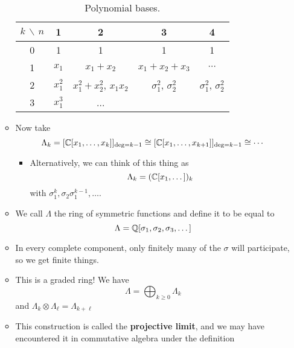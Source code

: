 \documentclass[../notes.tex]{subfiles}
\begin{document}
\begin{itemize}
\begin{itemize}
        \begin{table}[h!]
            \centering
            \small
            \renewcommand{\arraystretch}{1.2}
            \begin{tabular}{c|cccc}
                $k\,\backslash\,n$ & 1 & 2 & 3 & 4\\
                \hline
                0 & 1 & 1 & 1 & 1\\
                1 & $x_1$ & $x_1+x_2$ & $x_1+x_2+x_3$ & $\cdots$\\
                2 & $x_1^2$ & $x_1^2+x_2^2$, $x_1x_2$ & $\sigma_1^2$, $\sigma_2^2$ & $\sigma_1^2$, $\sigma_2^2$\\
                3 & $x_1^3$ & ...
            \end{tabular}
            \caption{Polynomial bases.}
            \label{tab:polynomialBases}
        \end{table}
        \item Now take
        \begin{equation*}
            \Lambda_k = [\mathbb{C}[x_1,\dots,x_k]]_{\deg=k-1}
            \cong [\mathbb{C}[x_1,\dots,x_{k+1}]]_{\deg=k-1}
            \cong \cdots
        \end{equation*}
        \begin{itemize}
            \item Alternatively, we can think of this thing as
            \begin{equation*}
                \Lambda_k = (\mathbb{C}[x_1,\dots])_k
            \end{equation*}
            with $\sigma_1^k,\sigma_2\sigma_1^{k-1},\dots$.
        \end{itemize}
        \item We call $\Lambda$ the ring of symmetric functions and define it to be equal to
        \begin{equation*}
            \Lambda = \mathbb{Q}[\sigma_1,\sigma_2,\sigma_3,\dots]
        \end{equation*}
        \item In every complete component, only finitely many of the $\sigma$ will participate, so we get finite things.
        \item This is a graded ring! We have
        \begin{equation*}
            \Lambda = \bigoplus_{k\geq 0}\Lambda_k
        \end{equation*}
        and $\Lambda_k\otimes\Lambda_\ell=\Lambda_{k+\ell}$
        \item This construction is called the \textbf{projective limit}, and we may have encountered it in commutative algebra under the definition

\end{itemize}
\end{itemize}
\end{document}
